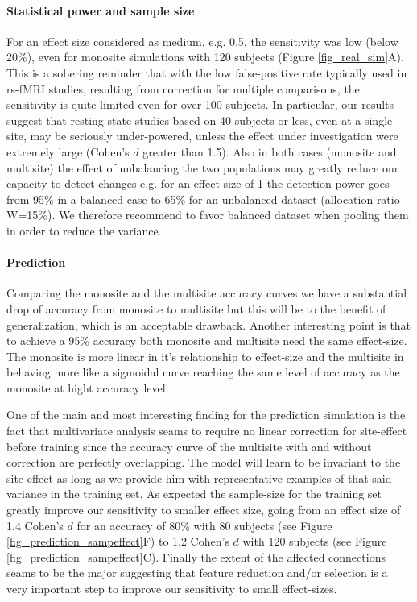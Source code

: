 \documentclass[authoryear]{elsarticle}
\begin{document}
\paragraph{Statistical power and sample size} For an effect size considered as medium, e.g. 0.5, the sensitivity was low (below 20\%), even for monosite simulations with 120 subjects (Figure \ref{fig_real_sim}A). This is a sobering reminder that with the low false-positive rate typically used in rs-fMRI studies, resulting from correction for multiple comparisons, the sensitivity is quite limited even for over 100 subjects. In particular, our results suggest that resting-state studies based on 40 subjects or less, even at a single site, may be seriously under-powered, unless the effect under investigation were extremely large (Cohen's $d$ greater than 1.5). Also in both cases (monosite and multisite) the effect of unbalancing the two populations may greatly reduce our capacity to detect changes e.g. for an effect size of 1 the detection power goes from 95\% in a balanced case to 65\% for an unbalanced dataset (allocation ratio W=15\%). We therefore recommend to favor balanced dataset when pooling them in order to reduce the variance.

\paragraph{Prediction}
Comparing the monosite and the multisite accuracy curves we have a substantial drop of accuracy from monosite to multisite but this will be to the benefit of generalization, which is an acceptable drawback. Another interesting point is that to achieve a 95\% accuracy both monosite and multisite need the same effect-size. The monosite is more linear in it's relationship to effect-size and the multisite in behaving more like a sigmoidal curve reaching the same level of accuracy as the monosite at hight accuracy level.

One of the main and most interesting finding for the prediction simulation is the fact that multivariate analysis seams to  require no linear correction for site-effect before training since the accuracy curve of the multisite with and without correction are perfectly overlapping. The model will learn to be invariant to the site-effect as long as we provide him with representative examples of that said variance in the training set. As expected the sample-size for the training set greatly improve our sensitivity to smaller effect size, going from an effect size of 1.4 Cohen's $d$ for an accuracy of 80\% with 80 subjects (see Figure \ref{fig_prediction_sampeffect}F) to 1.2 Cohen's $d$ with 120 subjects (see Figure \ref{fig_prediction_sampeffect}C). Finally the extent of the affected connections seams to be the major suggesting that feature reduction and/or selection is a very important step to improve our sensitivity to small effect-sizes.
\end{document}
